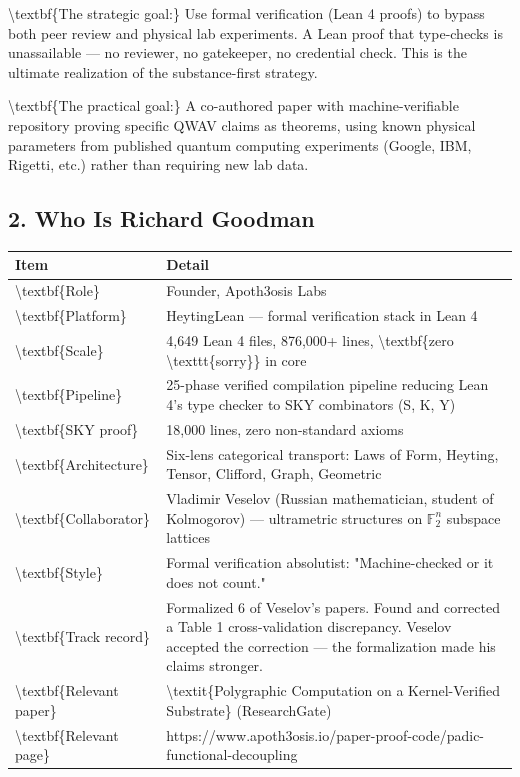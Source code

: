 \documentclass[11pt,a4paper]{article}
\begin{document}
\textbackslash{}textbf\{The strategic goal:\} Use formal verification (Lean 4 proofs) to bypass both peer review and physical lab experiments. A Lean proof that type-checks is unassailable  --- no reviewer, no gatekeeper, no credential check. This is the ultimate realization of the substance-first strategy.

\textbackslash{}textbf\{The practical goal:\} A co-authored paper with machine-verifiable repository proving specific QWAV claims as theorems, using known physical parameters from published quantum computing experiments (Google, IBM, Rigetti, etc.) rather than requiring new lab data.

\hrulefill


\subsection{2. Who Is Richard Goodman}


\begin{tabular}{|l|l|}
\hline
\textbf{Item} & \textbf{Detail} \\
\hline
\textbackslash{}textbf\{Role\} & Founder, Apoth3osis Labs \\
\hline
\textbackslash{}textbf\{Platform\} & HeytingLean  --- formal verification stack in Lean 4 \\
\hline
\textbackslash{}textbf\{Scale\} & 4,649 Lean 4 files, 876,000+ lines, \textbackslash{}textbf\{zero \textbackslash{}texttt\{sorry\}\} in core \\
\hline
\textbackslash{}textbf\{Pipeline\} & 25-phase verified compilation pipeline reducing Lean 4's type checker to SKY combinators (S, K, Y) \\
\hline
\textbackslash{}textbf\{SKY proof\} & 18,000 lines, zero non-standard axioms \\
\hline
\textbackslash{}textbf\{Architecture\} & Six-lens categorical transport: Laws of Form, Heyting, Tensor, Clifford, Graph, Geometric \\
\hline
\textbackslash{}textbf\{Collaborator\} & Vladimir Veselov (Russian mathematician, student of Kolmogorov)  --- ultrametric structures on $\mathbb{F}_2^n$ subspace lattices \\
\hline
\textbackslash{}textbf\{Style\} & Formal verification absolutist: "Machine-checked or it does not count." \\
\hline
\textbackslash{}textbf\{Track record\} & Formalized 6 of Veselov's papers. Found and corrected a Table 1 cross-validation discrepancy. Veselov accepted the correction  --- the formalization made his claims stronger. \\
\hline
\textbackslash{}textbf\{Relevant paper\} & \textbackslash{}textit\{Polygraphic Computation on a Kernel-Verified Substrate\} (ResearchGate) \\
\hline
\textbackslash{}textbf\{Relevant page\} & https://www.apoth3osis.io/paper-proof-code/padic-functional-decoupling \\
\hline
\end{tabular}
\end{document}
